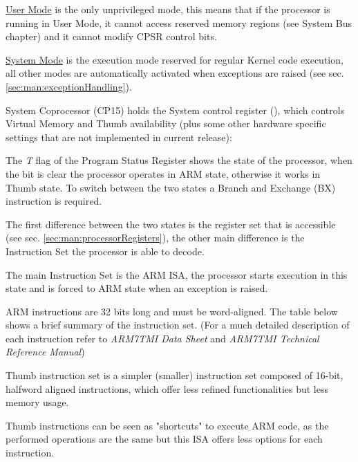 \uline{User Mode} is the only unprivileged mode, this means that if the processor is running in User Mode, it cannot access reserved memory regions (see System Bus chapter) and it cannot modify CPSR control bits.

\uline{System Mode} is the execution mode reserved for regular Kernel code execution, all other modes are automatically activated when exceptions are raised (see sec. \ref{sec:man:exceptionHandling}).

\label{sec:manual:systemControlRegister}

System Coprocessor (CP15) holds the System control register (), which controls Virtual Memory and Thumb availability (plus some other hardware specific settings that are not implemented in current release):



The \emph{T} flag of the Program Status Register shows the state of the processor, when the bit is clear the processor operates in ARM state, otherwise it works in Thumb state. To switch between the two states a Branch and Exchange (BX) instruction is required.

The first difference between the two states is the register set that is accessible (see sec. \ref{sec:man:processorRegisters}), the other main difference is the Instruction Set the processor is able to decode.


The main Instruction Set is the ARM ISA, the processor starts execution in this state and is forced to ARM state when an exception is raised.

ARM instructions are 32 bits long and must be word-aligned. The table below shows a brief summary of the instruction set. (For a much detailed description of each instruction refer to \emph{ARM7TMI Data Sheet} and \emph{ARM7TMI Technical Reference Manual})



Thumb instruction set is a simpler (smaller) instruction set composed of 16-bit, halfword aligned instructions, which offer less refined functionalities but less memory usage.

Thumb instructions can be seen as "shortcuts" to execute ARM code, as the performed operations are the same but this ISA offers less options for each instruction.

